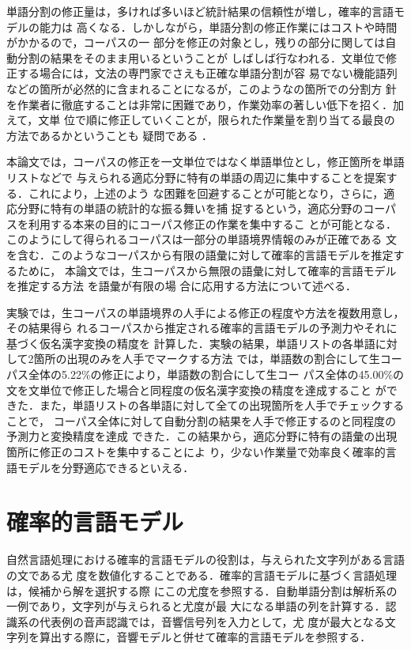 単語分割の修正量は，多ければ多いほど統計結果の信頼性が増し，確率的言語モデルの能力は
高くなる．しかしながら，単語分割の修正作業にはコストや時間がかかるので，コーパスの一
部分を修正の対象とし，残りの部分に関しては自動分割の結果をそのまま用いるということが
しばしば行なわれる．文単位で修正する場合には，文法の専門家でさえも正確な単語分割が容
易でない機能語列などの箇所が必然的に含まれることになるが，このようなの箇所での分割方
針を作業者に徹底することは非常に困難であり，作業効率の著しい低下を招く．加えて，文単
位で順に修正していくことが，限られた作業量を割り当てる最良の方法であるかということも
疑問である
\cite{Unsupervised.and.Active.Learning.in.Automatic.Speech.Recognition.For.Call.Classification}
．

本論文では，コーパスの修正を一文単位ではなく単語単位とし，修正箇所を単語リストなどで
与えられる適応分野に特有の単語の周辺に集中することを提案する．これにより，上述のよう
な困難を回避することが可能となり，さらに，適応分野に特有の単語の統計的な振る舞いを捕
捉するという，適応分野のコーパスを利用する本来の目的にコーパス修正の作業を集中するこ
とが可能となる．このようにして得られるコーパスは一部分の単語境界情報のみが正確である
文を含む．このようなコーパスから有限の語彙に対して確率的言語モデルを推定するために，
本論文では，生コーパスから無限の語彙に対して確率的言語モデルを推定する方法
\cite{Word.N-gram.Probability.Estimation.From.A.Japanese.Raw.Corpus}を語彙が有限の場
合に応用する方法について述べる．

実験では，生コーパスの単語境界の人手による修正の程度や方法を複数用意し，その結果得ら
れるコーパスから推定される確率的言語モデルの予測力やそれに基づく仮名漢字変換の精度を
計算した．実験の結果，単語リストの各単語に対して2箇所の出現のみを人手でマークする方法
では，単語数の割合にして生コーパス全体の5.22\%の修正により，単語数の割合にして生コー
パス全体の45.00\%の文を文単位で修正した場合と同程度の仮名漢字変換の精度を達成すること
ができた．また，単語リストの各単語に対して全ての出現箇所を人手でチェックすることで，
コーパス全体に対して自動分割の結果を人手で修正するのと同程度の予測力と変換精度を達成
できた．この結果から，適応分野に特有の語彙の出現箇所に修正のコストを集中することによ
り，少ない作業量で効率良く確率的言語モデルを分野適応できるといえる．

\section{確率的言語モデル}
\label{section:LM}

自然言語処理における確率的言語モデルの役割は，与えられた文字列がある言語の文である尤
度を数値化することである．確率的言語モデルに基づく言語処理は，候補から解を選択する際
にこの尤度を参照する．自動単語分割は解析系の一例であり，文字列が与えられると尤度が最
大になる単語の列を計算する．認識系の代表例の音声認識では，音響信号列を入力として，尤
度が最大となる文字列を算出する際に，音響モデルと併せて確率的言語モデルを参照する．




